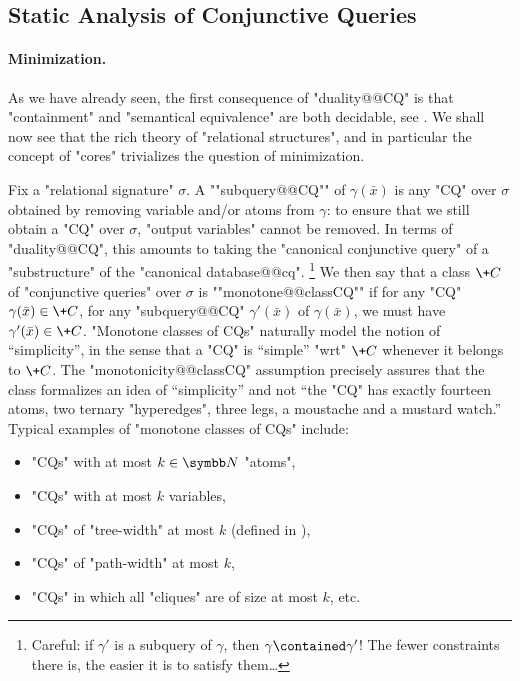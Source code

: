 \subsection{Static Analysis of Conjunctive Queries}
\label{sec:prelim-db-static-analysis-cq}

\paragraph*{Minimization.}
As we have already seen, the first consequence of "duality@@CQ" is that
"containment" and "semantical equivalence" are both
decidable, see .
We shall now see that the rich theory of "relational structures",
and in particular the concept of "cores" trivializes the question of minimization.

Fix a "relational signature" $\sigma$.
A ""subquery@@CQ"" of $\gamma(\bar x)$ is any "CQ" over $\sigma$
obtained by removing variable and/or atoms from $\gamma$:
to ensure that we still obtain a "CQ" over $\sigma$, "output variables" 
cannot be removed.
In terms of "duality@@CQ", this amounts to taking the "canonical conjunctive query" of
a "substructure" of the "canonical database@@cq".%
\footnote{Careful: if $\gamma'$ is a subquery of $\gamma$, then $\gamma \contained \gamma'$!
The fewer constraints there is, the easier it is to satisfy them…}
We then say that a class $\+C$ of "conjunctive queries" over $\sigma$ is ""monotone@@classCQ""
if for any "CQ" $\gamma(\bar x) \in \+C$, for any "subquery@@CQ" $\gamma'(\bar x)$ of
$\gamma(\bar x)$, we must have $\gamma'(\bar x) \in \+C$.
"Monotone classes of CQs" naturally model the notion of ``simplicity'', in the sense that
a "CQ" is ``simple'' "wrt" $\+C$ whenever it belongs to $\+C$. The "monotonicity@@classCQ"
assumption precisely assures that the class formalizes an idea of ``simplicity''
and not ``the "CQ" has exactly fourteen atoms, two ternary "hyperedges", three legs,
a moustache and a mustard watch.''
Typical examples of "monotone classes of CQs" include:
\begin{itemize}
	\item "CQs" with at most $k \in \N$ "atoms",
	\item "CQs" with at most $k$ variables,
	\item "CQs" of "tree-width" at most $k$ (defined in ),
	\item "CQs" of "path-width" at most $k$,
	\item "CQs" in which all "cliques" are of size at most $k$, etc.
\end{itemize}

